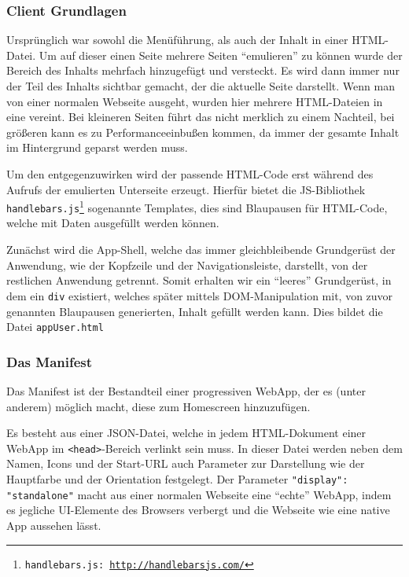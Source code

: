 \documentclass[a4paper,12pt,ngerman,listof=numbered]{scrartcl}      %
\providecommand{\inlinecode}[1]{\texttt{#1}}
\begin{document}
	\subsubsection{Client Grundlagen}
	Ursprünglich war sowohl die Me\-nü\-füh\-rung, als auch der Inhalt in einer HTML-Datei. Um auf dieser einen Seite mehrere Seiten ``emulieren'' zu können wurde der Bereich des Inhalts mehrfach hinzugefügt und versteckt. Es wird dann immer nur der Teil des Inhalts sichtbar gemacht, der die aktuelle Seite darstellt. Wenn man von einer normalen Webseite ausgeht, wurden hier mehrere HTML-Dateien in eine vereint. Bei kleineren Seiten führt das nicht merklich zu einem Nachteil, bei größeren kann es zu Performanceeinbußen kommen, da immer der gesamte Inhalt im Hintergrund geparst werden muss.\par
	Um den entgegenzuwirken wird der passende HTML-Code erst während des Aufrufs der emulierten Unterseite erzeugt. Hierfür bietet die JS-Bibliothek \inlinecode{handle\-bars.js\footnote{\inlinecode{handlebars.js}: \url{http://handlebarsjs.com/}}} sogenannte Templates, dies sind Blaupausen für HTML-Code, welche mit Daten ausgefüllt werden können.\par
	Zunächst wird die App-Shell, welche das immer gleichbleibende Grundgerüst der Anwendung, wie der Kopfzeile und der Navigations\-leiste, darstellt, von der restlichen Anwendung getrennt. Somit erhalten wir ein ``leeres'' Grundgerüst, in dem ein \inlinecode{div} existiert, welches später mittels DOM-Manipulation mit, von zuvor genannten Blaupausen generierten, Inhalt gefüllt werden kann. Dies bildet die Datei \inlinecode{appUser.html}\par

	\subsubsection{Das Manifest}
	Das Manifest ist der Bestandteil einer progressiven WebApp, der es (unter anderem) möglich macht, diese zum Homescreen hinzuzufügen.\par
	Es besteht aus einer JSON-Datei, welche in jedem HTML-Dokument einer WebApp im \inlinecode{<head>}-Bereich verlinkt sein muss. In dieser Datei werden neben dem Namen, Icons und der Start-URL auch Parameter zur Darstellung wie der Hauptfarbe und der Orientation festgelegt. Der Parameter \inlinecode{"{}display"{}: "{}standalone"{}} macht aus einer normalen Webseite eine ``echte'' WebApp, indem es jegliche UI-Elemente des Browsers verbergt und die Webseite wie eine native App aussehen lässt.\par
	
\end{document}

